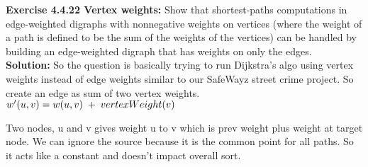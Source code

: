 \documentclass[11pt,fleqn]{article}
\begin{document}
\textbf{Exercise 4.4.22 Vertex weights:}  Show that shortest-paths computations in edge-weighted digraphs
with nonnegative weights on vertices (where the weight of a path is defined to
be the sum of the weights of the vertices) can be handled by building an edge-weighted
digraph that has weights on only the edges.\\

\textbf{Solution:} So the question is basically trying to run Dijkstra's algo using vertex weights instead of edge weights similar to our SafeWayz street crime project. So create an edge as sum of two vertex weights.\\

$w'(u,v)=w(u,v) \thickspace + \thickspace vertexWeight(v)$

Two nodes, u and v gives weight u to v which is prev weight plus weight at target node. We can ignore the source because it is the common point for all paths. So it acts like a constant and doesn't impact overall sort.


	
\end{document}
